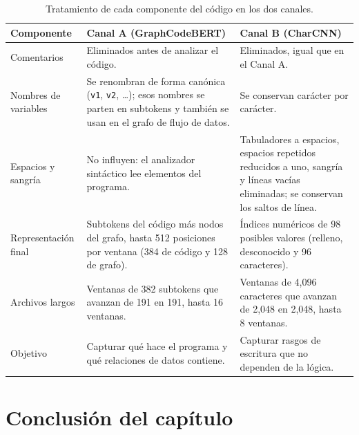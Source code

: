 \begin{table}[H]
    \centering
    \caption{Tratamiento de cada componente del código en los dos canales.}
    \label{tab:pipeline_dual_preprocesamiento}
    \renewcommand{\arraystretch}{1.25}
    \small
    \begin{tabularx}{\textwidth}{|l|X|X|}
        \hline
        \textbf{Componente} & \textbf{Canal A (GraphCodeBERT)} & \textbf{Canal B (CharCNN)} \\ \hline
        Comentarios & Eliminados antes de analizar el código. & Eliminados, igual que en el Canal A. \\ \hline
        Nombres de variables & Se renombran de forma canónica (\texttt{v1}, \texttt{v2}, \ldots); esos nombres se parten en subtokens y también se usan en el grafo de flujo de datos. & Se conservan carácter por carácter. \\ \hline
        Espacios y sangría & No influyen: el analizador sintáctico lee elementos del programa. & Tabuladores a espacios, espacios repetidos reducidos a uno, sangría y líneas vacías eliminadas; se conservan los saltos de línea. \\ \hline
        Representación final & Subtokens del código más nodos del grafo, hasta 512 posiciones por ventana (384 de código y 128 de grafo). & Índices numéricos de 98 posibles valores (relleno, desconocido y 96 caracteres). \\ \hline
        Archivos largos & Ventanas de 382 subtokens que avanzan de 191 en 191, hasta 16 ventanas. & Ventanas de 4,096 caracteres que avanzan de 2,048 en 2,048, hasta 8 ventanas. \\ \hline
        Objetivo & Capturar qué hace el programa y qué relaciones de datos contiene. & Capturar rasgos de escritura que no dependen de la lógica. \\ \hline
    \end{tabularx}
\end{table}

\section{Conclusión del capítulo}
\label{sec:conclusion_ingenieria_datos}


